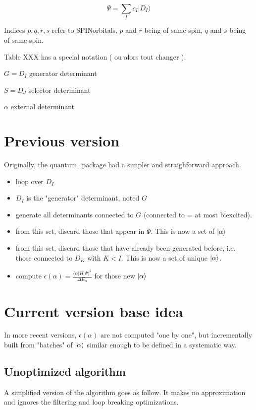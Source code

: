 \documentclass[./thesis.tex]{subfiles}
\begin{document}
$$\Psi = \sum_I {c_I | D_I \rangle}$$

Indices $p,q,r,s$ refer to SPINorbitals, $p$ and $r$ being of same spin, $q$ and $s$ being of same spin. 

Table XXX has a special notation ( ou alors tout changer ).

$G = D_I$ generator determinant

$S = D_J$ selector determinant

$\alpha$ external determinant

\section{Previous version}

Originally, the quantum\_package had a simpler and straighforward approach. 

\begin{itemize}
\item
loop over $D_I$
\item
$D_I$ is the "generator" determinant, noted $G$
\item
generate all determinants connected to $G$ (connected to = at most biexcited).
\item
from this set, discard those that appear in $\Psi$. This is now a set of $\ket \alpha$
\item
from this set, discard those that have already been generated before, i.e. those connected to $D_K$ with $K<I$. This is now a set of unique $\ket \alpha$.
\item
compute $\epsilon(\alpha) = \frac{\langle \alpha|H|\Psi\rangle^2}{\Delta E_\alpha}$ for those new $\ket \alpha$
\end{itemize}

\section{Current version base idea}



In more recent versions, $\epsilon(\alpha)$ are not computed "one by one", but incrementally built from "batches" of $\ket \alpha$ similar enough to be defined in a systematic way.

\subsection{Unoptimized algorithm}

A simplified version of the algorithm goes as follow. It makes no approximation and ignores the filtering and loop breaking optimizations.
\end{document}
